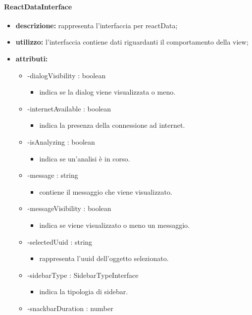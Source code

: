 \paragraph{ReactDataInterface}
\begin{itemize}
	\item \textbf{descrizione:} rappresenta l'interfaccia per reactData;
	\item \textbf{utilizzo:} l'interfaccia contiene dati riguardanti il comportamento della view;
	\item \textbf{attributi:}
	\begin{itemize}
		\item -dialogVisibility : boolean\begin{itemize}
			\item indica se la dialog viene visualizzata o meno.\end{itemize}
		\item -internetAvailable : boolean\begin{itemize}
			\item indica la presenza della connessione ad internet.\end{itemize}
		\item -isAnalyzing : boolean\begin{itemize}
			\item indica se un'analisi è in corso.\end{itemize}
		\item -message : string\begin{itemize}
			\item contiene il messaggio che viene visualizzato.\end{itemize}
		\item -messageVisibility : boolean\begin{itemize}
			\item indica se viene visualizzato o meno un messaggio.\end{itemize}
		\item -selectedUuid : string\begin{itemize}
			\item rappresenta l'uuid dell'oggetto selezionato.\end{itemize}
		\item -sidebarType : SidebarTypeInterface\begin{itemize}
			\item indica la tipologia di sidebar.\end{itemize}
		\item -snackbarDuration : number\begin{itemize}

\end{itemize}
\end{itemize}
\end{itemize}
